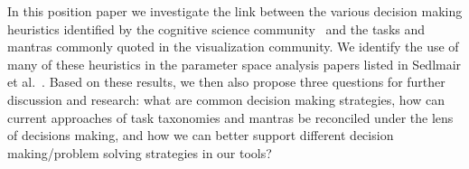 In this position paper we investigate the link between the various decision 
making heuristics identified by the cognitive science 
community~\citep{Payne:1993} and the tasks and mantras commonly quoted in
the visualization community. We identify the use of many of these heuristics
in the parameter space analysis papers listed in Sedlmair et 
al.~\citep{Sedlmair:2014}. Based on these results, we then also propose three 
questions for further discussion and research: what are common decision 
making strategies, how can current approaches of task taxonomies and mantras 
be reconciled under the lens of decisions making, and how we can better 
support different decision making/problem solving strategies in our tools?

